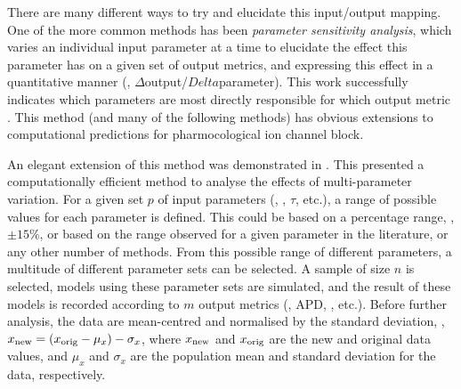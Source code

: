 \documentclass[../thesis-main.tex]{subfiles}
\begin{document}
 There are many different ways to try and elucidate this input/output mapping. One of the more common methods has been \emph{parameter sensitivity analysis}, which varies an individual input parameter at a time to elucidate the effect this parameter has on a given set of output metrics, and expressing this effect in a quantitative manner (\idest{}, $\Delta$output/$Delta$parameter). This work successfully indicates which parameters are most directly responsible for which output metric \citep{Nygren1998, Romero2009, Romero2010, Corrias2011, Romero2011}. This method (and many of the following methods) has obvious extensions to computational predictions for pharmocological ion channel block.
 
 An elegant extension of this method was demonstrated in \citet{Sobie2009}. This presented a computationally efficient method to analyse the effects of multi-parameter variation. For a given set $p$ of input parameters (\eg{}, \gnak{}, $\tau$, etc.), a range of possible values for each parameter is defined. This could be based on a percentage range, \eg{}, $\pm15\%$, or based on the range observed for a given parameter in the literature, or any other number of methods. From this possible range of different parameters, a multitude of different parameter sets can be selected. A sample of size $n$ is selected, models using these parameter sets are simulated, and the result of these models is recorded according to $m$ output metrics (\eg{}, APD, \casys{}, etc.). Before further analysis, the data are mean-centred and normalised by the standard deviation, \idest{}, $x_\textnormal{new} = (x_\textnormal{orig}-\mu_x)-\sigma_x$, where $x_\textnormal{new}$ and $x_\textnormal{orig}$ are the new and original data values, and $\mu_x$ and $\sigma_x$ are the population mean and standard deviation for the data, respectively.
 
\end{document}
